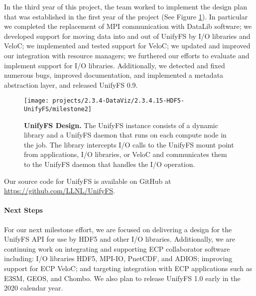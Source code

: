 In the third year of this project, the team worked to implement the
design plan that was established in the first
year of the project (See Figure \ref{fig:milestone2}). In particular
we completed the replacement of MPI communication with DataLib software; we developed
support for moving data into and out of UnifyFS by I/O libraries and VeloC;
we implemented and tested support for VeloC; we updated and improved our integration
with resource managers; we furthered our efforts to evaluate and implement support for I/O 
libraries. Additionally, we detected and fixed numerous bugs, improved documentation, and
implemented a metadata abstraction layer, and released UnifyFS 0.9.
\begin{figure}[htb]
        \centering
        \texttt{[image: projects/2.3.4-DataViz/2.3.4.15-HDF5-UnifyFS/milestone2]}
        \caption{\label{fig:milestone2} \textbf{UnifyFS Design.} The UnifyFS
instance consists of a dynamic library and a UnifyFS daemon that runs
on each compute node in the job. The library intercepts I/O calls to
the UnifyFS mount point from applications, I/O libraries, or VeloC and communicates them to the UnifyFS daemon that handles the I/O operation.}
\end{figure}


Our source code for UnifyFS is available on 
GitHub at \url{https://github.com/LLNL/UnifyFS}. 
\paragraph{Next Steps}

For our next milestone effort, we are focused on delivering a design for 
the UnifyFS API for use by HDF5 and other I/O libraries. Additionally, we are continuing work on 
integrating and supporting ECP collaborator software including:
I/O libraries HDF5, MPI-IO, PnetCDF, and ADIOS; improving
support for ECP VeloC; and targeting integration with ECP applications such as
E3SM, GEOS, and Chombo.
We also plan to release UnifyFS 1.0 early in the 2020 calendar year.



